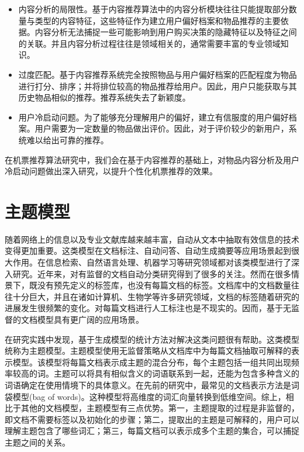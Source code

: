 \begin{itemize}
	\item 内容分析的局限性。基于内容推荐算法中的内容分析模块往往只能提取部分数量与类型的内容特征，这些特征作为建立用户偏好档案和物品推荐的主要依据。内容分析无法捕捉一些可能影响到用户购买决策的隐藏特征以及特征之间的关联。并且内容分析过程往往是领域相关的，通常需要丰富的专业领域知识。
	\item 过度匹配。基于内容推荐系统完全按照物品与用户偏好档案的匹配程度为物品进行打分、排序；并将排位较高的物品推荐给用户。因此，用户只能获取与其历史物品相似的推荐。推荐系统失去了新颖度。
	\item 用户冷启动问题。为了能够充分理解用户的偏好，建立有信服度的用户偏好档案。用户需要为一定数量的物品做出评价。因此，对于评价较少的新用户，系统难以给出可靠的推荐。
\end{itemize}

在机票推荐算法研究中，我们会在基于内容推荐的基础上，对物品内容分析及用户冷启动问题做出深入研究，以提升个性化机票推荐的效果。

\section{主题模型}

随着网络上的信息以及专业文献库越来越丰富，自动从文本中抽取有效信息的技术变得更加重要。这类模型在文档标注、自动问答、自动生成摘要等应用场景起到很大作用。在信息检索、自然语言处理、机器学习等研究领域都对该类模型进行了深入研究。近年来，对有监督的文档自动分类研究得到了很多的关注\parencite{yang1999evaluation}。然而在很多情景下，既没有预先定义的标签库，也没有每篇文档的标签。文档库中的文档数量往往十分巨大，并且在诸如计算机、生物学等许多研究领域，文档的标签随着研究的进展发生很频繁的变化。对每篇文档进行人工标注也是不现实的。因而，基于无监督的文档模型具有更广阔的应用场景。

在研究实践中发现，基于生成模型\parencite{zhong2005generative,hofmann1999probabilistic,blei2003latent,minka2002expectation}的统计方法对解决这类问题很有帮助。这类模型统称为主题模型。主题模型使用无监督策略从文档库中为每篇文档抽取可解释的表示模型。该模型将每篇文档表示成主题的混合分布，每个主题包括一组共同出现频率较高的词。主题可以将具有相似含义的词语联系到一起，还能为包含多种含义的词语确定在使用情境下的具体意义。在先前的研究中，最常见的文档表示方法是词袋模型(bag of words)\parencite{zhang2010understanding}。这种模型将高维度的词汇向量转换到低维空间。综上，相比于其他的文档模型，主题模型有三点优势。第一，主题提取的过程是非监督的，即文档不需要标签以及初始化的步骤；第二，提取出的主题是可解释的，用户可以理解主题包含了哪些词汇；第三，每篇文档可以表示成多个主题的集合，可以捕捉主题之间的关系。


